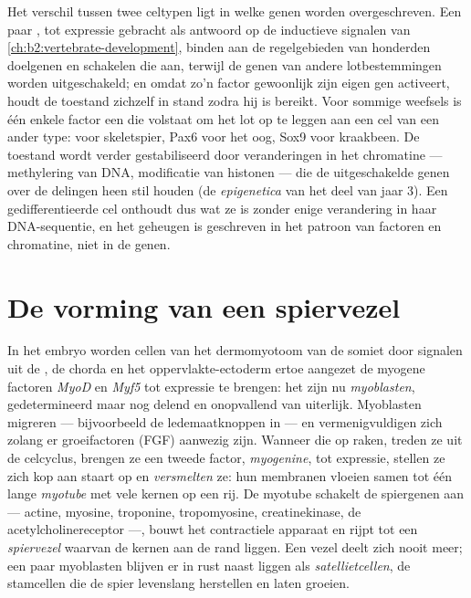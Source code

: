 \begin{proposition}\label{prop:b2:cell-differentiation:transcriptional}
Het verschil tussen twee celtypen ligt in welke genen worden
overgeschreven. Een paar \emph{}, tot expressie gebracht
als antwoord op de inductieve signalen van
\cref{ch:b2:vertebrate-development}, binden aan de regelgebieden van
honderden doelgenen en schakelen die aan, terwijl de genen van andere
lotbestemmingen worden uitgeschakeld; en omdat zo'n factor gewoonlijk zijn
eigen gen activeert, houdt de toestand zichzelf in stand zodra hij is
bereikt. Voor sommige weefsels is één enkele factor een \emph{}
die volstaat om het lot op te leggen aan een cel van een ander type: 
voor skeletspier, Pax6 voor het oog, Sox9 voor kraakbeen. De toestand wordt
verder gestabiliseerd door veranderingen in het chromatine --- methylering
van DNA, modificatie van histonen --- die de uitgeschakelde genen over de
delingen heen stil houden (de \emph{epigenetica} van het deel van jaar 3).
Een gedifferentieerde cel onthoudt dus wat ze is zonder enige verandering
in haar DNA-sequentie, en het geheugen is geschreven in het patroon van
factoren en chromatine, niet in de genen.
\end{proposition}

\section{De vorming van een spiervezel}

\begin{definition}[Myogenese]\label{def:b2:cell-differentiation:myogenesis}
In het embryo worden cellen van het dermomyotoom van de somiet door
signalen uit de , de chorda en het oppervlakte-ectoderm ertoe
aangezet de myogene factoren \emph{MyoD} en \emph{Myf5} tot expressie te
brengen: het zijn nu \emph{myoblasten}, gedetermineerd maar nog delend en
onopvallend van uiterlijk. Myoblasten migreren --- bijvoorbeeld de
ledemaatknoppen in --- en vermenigvuldigen zich zolang er groeifactoren
(FGF) aanwezig zijn. Wanneer die op raken, treden ze uit de celcyclus,
brengen ze een tweede factor, \emph{myogenine}, tot expressie, stellen ze
zich kop aan staart op en \emph{versmelten} ze: hun membranen vloeien samen
tot één lange \emph{myotube} met vele kernen op een rij. De myotube
schakelt de spiergenen aan --- actine, myosine, troponine, tropomyosine,
creatinekinase, de acetylcholinereceptor ---, bouwt het contractiele
apparaat en rijpt tot een \emph{spiervezel} waarvan de kernen aan de
rand liggen. Een vezel deelt zich nooit meer; een paar myoblasten blijven
er in rust naast liggen als \emph{satellietcellen}, de stamcellen die de
spier levenslang herstellen en laten groeien.
\end{definition}

